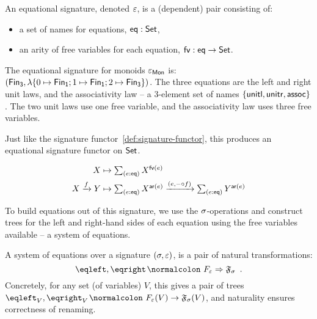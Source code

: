 \begin{definition}
    An equational signature, denoted $\varepsilon$, is a (dependent) pair consisting of:
    \begin{itemize}
        \item a set of names for equations, $\operatorname{\mathsf{eq}} : \mathsf{Set}$,
        \item an arity of free variables for each equation, $\operatorname{\mathsf{fv}} : \operatorname{\mathsf{eq}} \to \mathsf{Set}$.
    \end{itemize}
\end{definition}

\begin{example}
    The equational signature for monoids $\varepsilon_{\mathsf{Mon}}$ is:
    $(\Fin[3],\lambda \{0 \mapsto \Fin[1] ; 1 \mapsto \Fin[1] ; 2 \mapsto \Fin[3] \})$.
    The three equations are the left and right unit laws, and the associativity law --
    a 3-element set of names $\{ \operatorname{\mathsf{unitl}}, \operatorname{\mathsf{unitr}}, \operatorname{\mathsf{assoc}} \}$.
    The two unit laws use one free variable,
    and the associativity law uses three free variables.
\end{example}

Just like the signature functor~\cref{def:signature-functor}, this produces an equational signature functor on $\mathsf{Set}$.
\begin{definition}
    \label{def:equational-signature-functor}
    \begin{align*}
        X           & \mapsto \dsum{e:\eqop}{X^{\eqfv(e)}} \\
        X \xto{f} Y & \mapsto
        \dsum{e:\eqop}{X^{\ar(e)}}
        \xto{(e, \blank \comp f)}
        \dsum{e:\eqop}{Y^{\ar(e)}}
    \end{align*}
\end{definition}

To build equations out of this signature,
we use the $\sigma$-operations and construct trees for the left and right-hand sides of each equation using the
free variables available -- a system of equations.
%
\begin{definition}
    A system of equations over a signature $(\sigma,\varepsilon)$, is a pair of natural transformations:
    \[
        \eqleft, \eqright \colon \EqSig \natto \str{F}_{\sig} \enspace.
    \]
    Concretely, for any set (of variables) $V$,
    this gives a pair of trees $\eqleft_{V}, \eqright_{V}\colon \EqSig(V) \to \str{F}_{\sig}(V)$,
    and naturality ensures correctness of renaming.
\end{definition}


